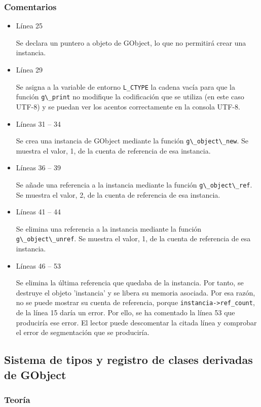 \subsubsection{Comentarios}
\begin{itemize}
\item Línea 25\par
  Se declara un puntero a objeto de \textsf{GObject}, lo que no permitirá crear una instancia.
\item Línea 29\par
  Se asigna a la variable de entorno \texttt{L\_CTYPE} la cadena vacía para que la función
  \passthrough{\lstinline!g\_print!} no modifique la codificación que se utiliza (en este caso UTF-8)
  y se puedan ver los acentos correctamente en la consola UTF-8.
\item Líneas 31 -- 34\par
  Se crea una instancia de \textsf{GObject} mediante la función \passthrough{\lstinline!g\_object\_new!}.
  Se muestra el valor, 1,  de la cuenta de referencia de esa instancia.
\item Líneas 36 -- 39\par
  Se añade una referencia a la instancia mediante la función  \passthrough{\lstinline!g\_object\_ref!}.
  Se muestra el valor, 2,  de la cuenta de referencia de esa instancia.
\item Líneas 41 -- 44\par
  Se elimina una referencia a la instancia mediante la función  \passthrough{\lstinline!g\_object\_unref!}.
  Se muestra el valor, 1,  de la cuenta de referencia de esa instancia.
\item Líneas 46 -- 53\par
  Se elimina la  última referencia que quedaba de la instancia.
  Por tanto, se destruye el objeto 'instancia' y se libera su memoria asociada.
  Por esa razón, no se puede mostrar su cuenta de referencia, porque
  \passthrough{\lstinline!instancia->ref_count!}, de la línea 15 daría un error.
  Por ello, se ha comentado la línea 53 que produciría ese error.
  El lector puede descomentar la citada línea y comprobar el error de segmentación que se produciría.
  \end{itemize}

\subsection{Sistema de tipos y registro de clases derivadas de \textsf{GObject}} \label{subsec:sistematipos_y_registro}
\subsubsection{Teoría}











